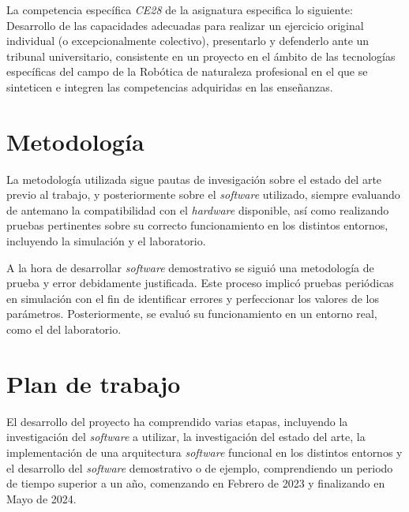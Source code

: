 La competencia específica \textit{CE28} de la asignatura especifica lo
siguiente:
Desarrollo de las capacidades adecuadas para realizar un ejercicio original
individual (o excepcionalmente colectivo), presentarlo y defenderlo ante un
tribunal universitario, consistente en un proyecto en el ámbito de las
tecnologías específicas del campo de la Robótica de naturaleza profesional en el
que se sinteticen e integren las competencias adquiridas en las enseñanzas.



\section{Metodología}
\label{sec:metodologia}

La metodología utilizada sigue pautas de invesigación sobre el estado del arte
previo al trabajo, y posteriormente sobre el \textit{software} utilizado,
siempre evaluando de antemano la compatibilidad con el \textit{hardware}
disponible, así como realizando pruebas pertinentes sobre su correcto
funcionamiento en los distintos entornos, incluyendo la simulación y el
laboratorio.

A la hora de desarrollar \textit{software} demostrativo se siguió una
metodología de prueba y error debidamente justificada.
Este proceso implicó pruebas periódicas en simulación con el fin de identificar
errores y perfeccionar los valores de los parámetros.
Posteriormente, se evaluó su funcionamiento en un entorno real, como el del
laboratorio.


\section{Plan de trabajo}
\label{sec:plantrabajo}

El desarrollo del proyecto ha comprendido varias etapas, incluyendo la
investigación del \textit{software} a utilizar, la investigación del estado del
arte, la implementación de una arquitectura \textit{software} funcional en los
distintos entornos y el desarrollo del \textit{software} demostrativo o de
ejemplo, comprendiendo un periodo de tiempo superior a un año, comenzando en
Febrero de 2023 y finalizando en Mayo de 2024.



